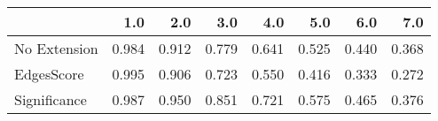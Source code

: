 \begin{tabular}{lrrrrrrr}
\toprule
{} &   1.0 &   2.0 &   3.0 &   4.0 &   5.0 &   6.0 &   7.0 \\
\midrule
No Extension & 0.984 & 0.912 & 0.779 & 0.641 & 0.525 & 0.440 & 0.368 \\
EdgesScore   & 0.995 & 0.906 & 0.723 & 0.550 & 0.416 & 0.333 & 0.272 \\
Significance & 0.987 & 0.950 & 0.851 & 0.721 & 0.575 & 0.465 & 0.376 \\
\bottomrule
\end{tabular}
